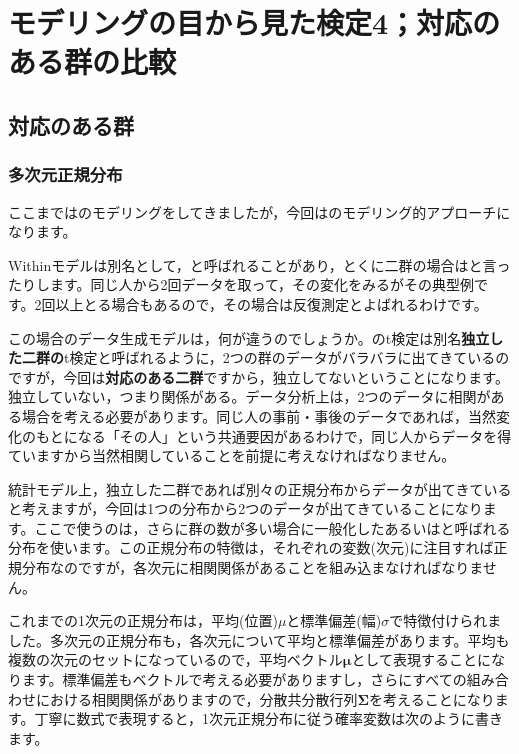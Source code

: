 \documentclass{ltjsbook}
\begin{document}
\VerbatimFootnotes
\chapter{モデリングの目から見た検定4；対応のある群の比較}
\label{x22_modeling4}
\section{対応のある群}
\subsection{多次元正規分布}
ここまではのモデリングをしてきましたが，今回はのモデリング的アプローチになります。

Withinモデルは別名として，と呼ばれることがあり，とくに二群の場合はと言ったりします。同じ人から2回データを取って，その変化をみるがその典型例です。2回以上とる場合もあるので，その場合は反復測定とよばれるわけです。

この場合のデータ生成モデルは，何が違うのでしょうか。のt検定は別名\textbf{独立した二群の}t検定と呼ばれるように，2つの群のデータがバラバラに出てきているのですが，今回は\textbf{対応のある二群}ですから，独立してないということになります。独立していない，つまり関係がある。データ分析上は，2つのデータに相関がある場合を考える必要があります。同じ人の事前・事後のデータであれば，当然変化のもとになる「その人」という共通要因があるわけで，同じ人からデータを得ていますから当然相関していることを前提に考えなければなりません。

統計モデル上，独立した二群であれば別々の正規分布からデータが出てきていると考えますが，今回は1つの分布から2つのデータが出てきていることになります。ここで使うのは，さらに群の数が多い場合に一般化したあるいはと呼ばれる分布を使います。この正規分布の特徴は，それぞれの変数(次元)に注目すれば正規分布なのですが，各次元に相関関係があることを組み込まなければなりません。

これまでの1次元の正規分布は，平均(位置)$\mu$と標準偏差(幅)$\sigma$で特徴付けられました。多次元の正規分布も，各次元について平均と標準偏差があります。平均も複数の次元のセットになっているので，平均ベクトル$\bm{\mu}$として表現することになります。標準偏差もベクトルで考える必要がありますし，さらにすべての組み合わせにおける相関関係がありますので，分散共分散行列$\bm{\Sigma}$を考えることになります。丁寧に数式で表現すると，1次元正規分布に従う確率変数は次のように書きます。
\end{document}
